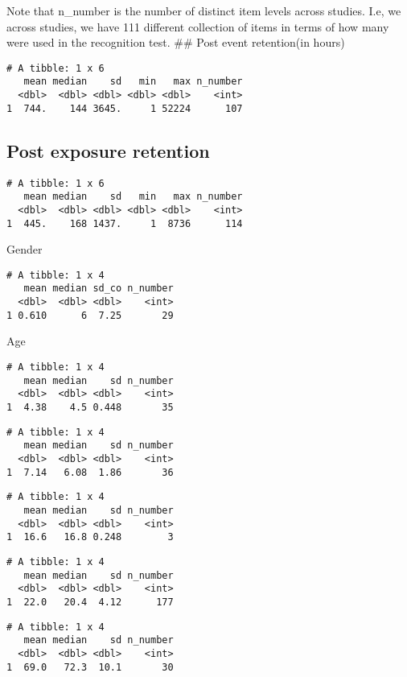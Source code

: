 \documentclass[
  letterpaper,
  DIV=11,
  numbers=noendperiod]{scrartcl}
\begin{document}
Note that n\_number is the number of distinct item levels across
studies. I.e, we across studies, we have 111 different collection of
items in terms of how many were used in the recognition test. \#\# Post
event retention(in hours)

\begin{verbatim}
# A tibble: 1 x 6
   mean median    sd   min   max n_number
  <dbl>  <dbl> <dbl> <dbl> <dbl>    <int>
1  744.    144 3645.     1 52224      107
\end{verbatim}

\hypertarget{post-exposure-retention}{%
\subsection{Post exposure retention}\label{post-exposure-retention}}

\begin{verbatim}
# A tibble: 1 x 6
   mean median    sd   min   max n_number
  <dbl>  <dbl> <dbl> <dbl> <dbl>    <int>
1  445.    168 1437.     1  8736      114
\end{verbatim}

Gender

\begin{verbatim}
# A tibble: 1 x 4
   mean median sd_co n_number
  <dbl>  <dbl> <dbl>    <int>
1 0.610      6  7.25       29
\end{verbatim}

Age

\begin{verbatim}
# A tibble: 1 x 4
   mean median    sd n_number
  <dbl>  <dbl> <dbl>    <int>
1  4.38    4.5 0.448       35
\end{verbatim}

\begin{verbatim}
# A tibble: 1 x 4
   mean median    sd n_number
  <dbl>  <dbl> <dbl>    <int>
1  7.14   6.08  1.86       36
\end{verbatim}

\begin{verbatim}
# A tibble: 1 x 4
   mean median    sd n_number
  <dbl>  <dbl> <dbl>    <int>
1  16.6   16.8 0.248        3
\end{verbatim}

\begin{verbatim}
# A tibble: 1 x 4
   mean median    sd n_number
  <dbl>  <dbl> <dbl>    <int>
1  22.0   20.4  4.12      177
\end{verbatim}

\begin{verbatim}
# A tibble: 1 x 4
   mean median    sd n_number
  <dbl>  <dbl> <dbl>    <int>
1  69.0   72.3  10.1       30
\end{verbatim}
\end{document}
